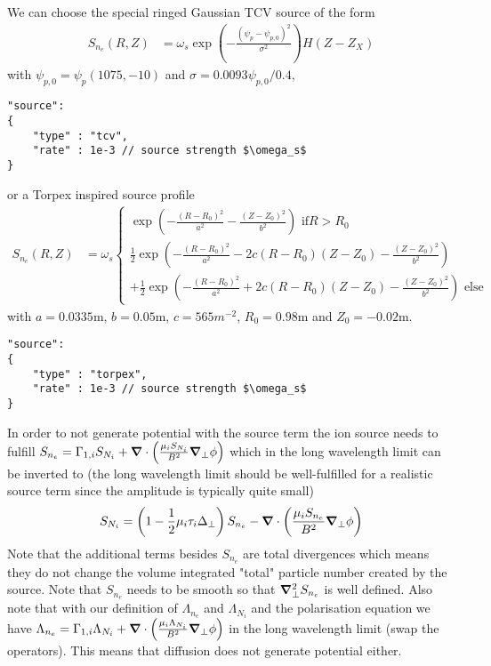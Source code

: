 We can choose the special ringed Gaussian TCV source of the form
\begin{align}
    S_{n_e}(R,Z) &= \omega_s \exp\left( -\frac{(\psi_p-\psi_{p,0})^2}{\sigma^2}\right)H(Z-Z_X)
\end{align}
with $\psi_{p,0} = \psi_p(1075, -10)$ and $\sigma = 0.0093\psi_{p,0}/0.4$,
\begin{verbatim}
"source":
{
    "type" : "tcv",
    "rate" : 1e-3 // source strength $\omega_s$
}
\end{verbatim}
or a Torpex inspired source profile
\begin{align} \label{eq:electron_source_torpex}
  S_{n_e}(R,Z) &= \omega_s
  \begin{cases}
    \exp\left( - \frac{(R-R_0)^2}{a^2 }- \frac{(Z-Z_0)^2}{b^2}\right) \text{ if} R > R_0 \\
    \frac{1}{2}\exp\left( - \frac{(R-R_0)^2}{a^2} -2c(R-R_0)(Z-Z_0)- \frac{(Z-Z_0)^2}{b^2} \right) \\
  +\frac{1}{2}\exp\left( - \frac{(R-R_0)^2}{a^2} +2c(R-R_0)(Z-Z_0)- \frac{(Z-Z_0)^2}{b^2} \right) \text{ else}
              \end{cases}
\end{align}
with $a=0.0335$m, $b=0.05$m, $c=565m^{-2}$, $R_0=0.98$m and $Z_0=-0.02$m.
\begin{verbatim}
"source":
{
    "type" : "torpex",
    "rate" : 1e-3 // source strength $\omega_s$
}
\end{verbatim}

In order to not generate potential with the source term the
ion source needs to fulfill $S_{n_e} = \Gamma_{1,i}S_{N_i} + {\boldsymbol{\nabla}}\cdot\left( \frac{\mu_i S_{N_i}}{B^2}{\boldsymbol{\nabla}}_{\perp} \phi\right)$ which in the long wavelength limit can be inverted to (the long wavelength limit should be well-fulfilled for a realistic source term since the amplitude is typically quite small)
\begin{align}
    S_{N_i} = \left(1-\frac{1}{2}\mu_i \tau_i \Delta_\perp\right) S_{n_e} -{\boldsymbol{\nabla}}\cdot\left( \frac{\mu_i S_{n_e}}{B^2}{\boldsymbol{\nabla}}_{\perp} \phi\right)
  \label{eq:ion_source}
\end{align}
Note that the additional terms besides $S_{n_e}$ are total divergences which means
they do not change the volume integrated "total" particle number created by the source.
Note that $S_{n_e}$ needs to be smooth
so that ${\boldsymbol{\nabla}}_{\perp}^2 S_{n_e}$ is well defined.
Also note that with our definition of $\Lambda_{n_e}$ and $\Lambda_{N_i}$ and
the polarisation equation we have $\Lambda_{n_e} = \Gamma_{1,i}\Lambda_{N_i} + {\boldsymbol{\nabla}}\cdot\left( \frac{\mu_i \Lambda_{N_i}}{B^2}{\boldsymbol{\nabla}}_{\perp} \phi\right)$ in the long wavelength limit (swap the operators).
This means that diffusion does not generate potential either.

